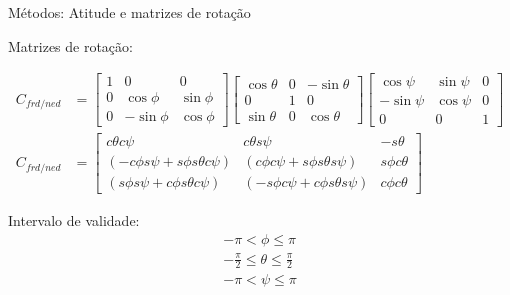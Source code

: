 \documentclass{beamer}
\begin{document}
\begin{frame}{Métodos: Atitude e matrizes de rotação}

Matrizes de rotação:

\begin{align*}
    C_{f\!r\!d\!/\!n\!e\!d} &=
    \begin{bmatrix}
        1               &  0            &  0             \\
        0               &  \cos{\phi}   &  \sin{\phi}    \\
        0               & -\sin{\phi}   &  \cos{\phi}
    \end{bmatrix}
    \begin{bmatrix}
        \cos{ \theta}   &  0            & -\sin{\theta} \\
        0               &  1            &  0            \\
        \sin{ \theta}   &  0            &  \cos{\theta}
    \end{bmatrix}
    \begin{bmatrix}
        \cos{\psi}      &  \sin{\psi}   &  0             \\
       -\sin{\psi}      &  \cos{\psi}   &  0             \\
        0               &  0            &  1
    \end{bmatrix} \\
    C_{f\!r\!d\!/\!n\!e\!d} &=
    \begin{bmatrix}
        c\theta c\psi   & c\theta s\psi & -s\theta    \\
        \left(-c\phi s\psi + s\phi s\theta c\psi \right)
        &  \left( c\phi c\psi + s\phi s\theta s\psi \right)
        &  s\phi c\theta                                 \\
        \left( s\phi s\psi + c\phi s\theta c\psi \right)
        &  \left( -s\phi c\psi + c\phi s\theta s\psi \right)
        & c\phi c\theta
    \end{bmatrix}
\end{align*}

Intervalo de validade:
\begin{align*}
    -\pi  < \phi \leq \pi \\
    -\frac{\pi}{2} \leq \theta \leq \frac{\pi}{2} \\
    -\pi < \psi \leq \pi
\end{align*}
\end{frame}
\end{document}
